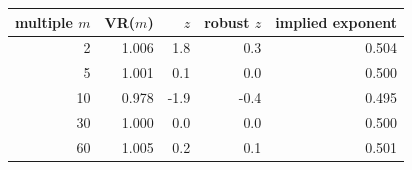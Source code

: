 \begin{tabular}{|r|r|r|r|r|}
\hline
\rowcolor{gray!15}multiple $m$ & VR($m$) & $z$ & robust $z$ & implied exponent \\
\hline
2 & 1.006 & 1.8 & 0.3 & 0.504 \\
\hline
5 & 1.001 & 0.1 & 0.0 & 0.500 \\
\hline
10 & 0.978 & -1.9 & -0.4 & 0.495 \\
\hline
30 & 1.000 & 0.0 & 0.0 & 0.500 \\
\hline
60 & 1.005 & 0.2 & 0.1 & 0.501 \\
\hline
\end{tabular}

